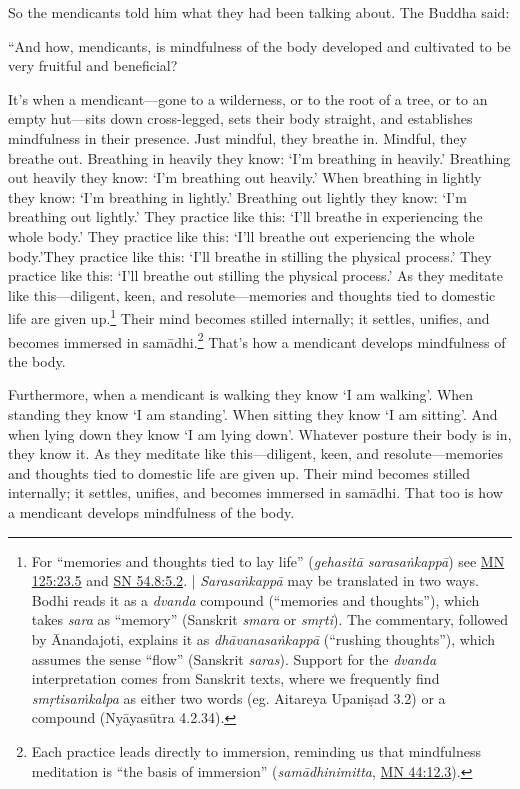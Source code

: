 \documentclass[12pt,openany]{book}%
\begin{document}
So the mendicants told him what they had been talking about. The Buddha said: 

“And how, mendicants, is mindfulness of the body developed and cultivated to be very fruitful and beneficial? 

It’s when a mendicant—gone to a wilderness, or to the root of a tree, or to an empty hut—sits down cross-legged, sets their body straight, and establishes mindfulness in their presence. Just mindful, they breathe in. Mindful, they breathe out. Breathing in heavily they know: ‘I’m breathing in heavily.’ Breathing out heavily they know: ‘I’m breathing out heavily.’ When breathing in lightly they know: ‘I’m breathing in lightly.’ Breathing out lightly they know: ‘I’m breathing out lightly.’ They practice like this: ‘I’ll breathe in experiencing the whole body.’ They practice like this: ‘I’ll breathe out experiencing the whole body.’They practice like this: ‘I’ll breathe in stilling the physical process.’ They practice like this: ‘I’ll breathe out stilling the physical process.’ As they meditate like this—diligent, keen, and resolute—memories and thoughts tied to domestic life are given up.\footnote{For “memories and thoughts tied to lay life” (\textit{\textsanskrit{gehasitā} \textsanskrit{sarasaṅkappā}}) see \href{https://suttacentral.net/mn125/en/sujato\#23.5}{MN 125:23.5} and \href{https://suttacentral.net/sn54.8/en/sujato\#5.2}{SN 54.8:5.2}. | \textit{\textsanskrit{Sarasaṅkappā}} may be translated in two ways. Bodhi reads it as a \textit{dvanda} compound (“memories and thoughts”), which takes \textit{sara} as “memory” (Sanskrit \textit{smara} or \textit{\textsanskrit{smṛti}}). The commentary, followed by Ānandajoti, explains it as \textit{\textsanskrit{dhāvanasaṅkappā}} (“rushing thoughts”), which assumes the sense “flow” (Sanskrit \textit{saras}). Support for the \textit{dvanda} interpretation comes from Sanskrit texts, where we frequently find \textit{\textsanskrit{smṛtisaṁkalpa}} as either two words (eg. Aitareya \textsanskrit{Upaniṣad} 3.2) or a compound (\textsanskrit{Nyāyasūtra} 4.2.34). } Their mind becomes stilled internally; it settles, unifies, and becomes immersed in \textsanskrit{samādhi}.\footnote{Each practice leads directly to immersion, reminding us that mindfulness meditation is “the basis of immersion” (\textit{\textsanskrit{samādhinimitta}}, \href{https://suttacentral.net/mn44/en/sujato\#12.3}{MN 44:12.3}). } That’s how a mendicant develops mindfulness of the body. 

Furthermore, when a mendicant is walking they know ‘I am walking’. When standing they know ‘I am standing’. When sitting they know ‘I am sitting’. And when lying down they know ‘I am lying down’. Whatever posture their body is in, they know it. As they meditate like this—diligent, keen, and resolute—memories and thoughts tied to domestic life are given up. Their mind becomes stilled internally; it settles, unifies, and becomes immersed in \textsanskrit{samādhi}. That too is how a mendicant develops mindfulness of the body. 
\end{document}
